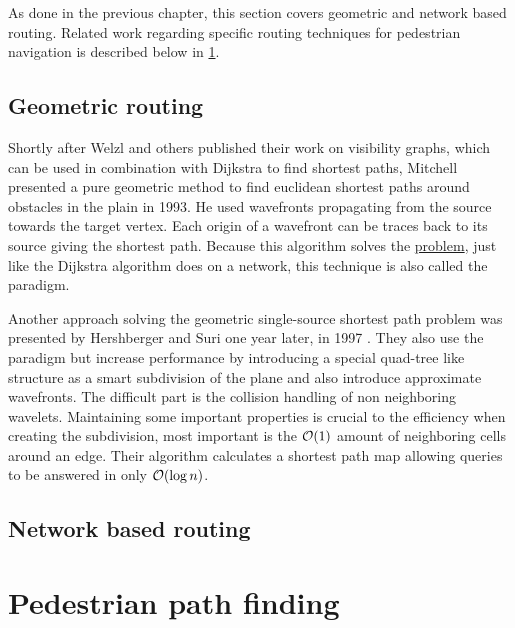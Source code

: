 	As done in the previous chapter, this section covers geometric and network based routing.
	Related work regarding specific routing techniques for pedestrian navigation is described below in \cref{sec:pedestrian-path-planning}.
	
	\subsection{Geometric routing}
	
		\label{related-work:mitchell}
		Shortly after Welzl and others published their work on visibility graphs, which can be used in combination with Dijkstra to find shortest paths, Mitchell presented a pure geometric method to find euclidean shortest paths around obstacles in the plain in 1993\cite{mitchell-shortest-path}.
		He used wavefronts propagating from the source towards the target vertex.
		Each origin of a wavefront can be traces back to its source giving the shortest path.
		Because this algorithm solves the \hyperref[subsubsec:single-source-shortest-path]{ problem}, just like the Dijkstra algorithm does on a network, this technique is also called the  paradigm.
		
		Another approach solving the geometric single-source shortest path problem was presented by Hershberger and Suri one year later, in 1997 \cite{hershberger-suri}.
		They also use the  paradigm but increase performance by introducing a special quad-tree like structure as a smart subdivision of the plane and also introduce approximate wavefronts.
		The difficult part is the collision handling of non neighboring wavelets.
		Maintaining some important properties is crucial to the efficiency when creating the subdivision, most important is the $\mathcal{O}(1)$ amount of neighboring cells around an edge.
		Their algorithm calculates a shortest path map allowing queries to be answered in only $\mathcal{O}(\log n)$.
		
	\subsection{Network based routing}

\section{Pedestrian path finding}
\label{sec:pedestrian-path-planning}
	
